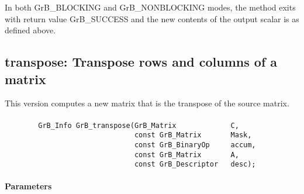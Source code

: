 In both {\sf GrB\_BLOCKING} and {\sf GrB\_NONBLOCKING} modes, the method exits with return value 
{\sf GrB\_SUCCESS} and the new contents of the output scalar is as defined above.




\subsection{{\sf transpose}: Transpose rows and columns of a matrix}

This version computes a new matrix that is the transpose of the source matrix.

\paragraph{\syntax}

\begin{verbatim}
        GrB_Info GrB_transpose(GrB_Matrix             C,
                               const GrB_Matrix       Mask,
                               const GrB_BinaryOp     accum,
                               const GrB_Matrix       A,
                               const GrB_Descriptor   desc);
\end{verbatim}

\paragraph{Parameters}

